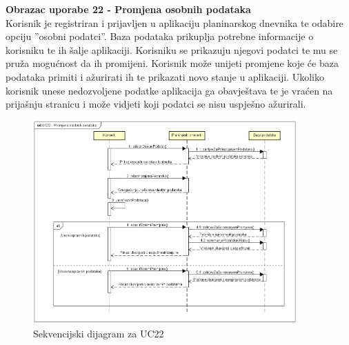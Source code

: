 \newpage
				
				\textbf{ Obrazac uporabe 22 - Promjena osobnih podataka}\\
				
Korisnik je registriran i prijavljen u aplikaciju planinarskog dnevnika te odabire opciju ''osobni podatci''. Baza podataka prikuplja potrebne informacije o korisniku te ih šalje aplikaciji. Korisniku se prikazuju njegovi podatci te mu se pruža mogućnost da ih promijeni. Korisnik može unijeti promjene koje će baza podataka primiti i ažurirati ih te prikazati novo stanje u aplikaciji. Ukoliko korisnik unese nedozvoljene podatke aplikacija ga obavještava te je vraćen na prijašnju stranicu i može vidjeti koji podatci se nisu uspješno ažurirali.				
				
				
				\begin{figure}[H]
					\centering
						\includegraphics[width=0.9\textwidth]{slike/UC22-Promjena_osobnih_podataka.png}
					\caption{Sekvencijski dijagram za UC22}
						\label{fig:mesh8}
				\end{figure}
	
\newpage
	
